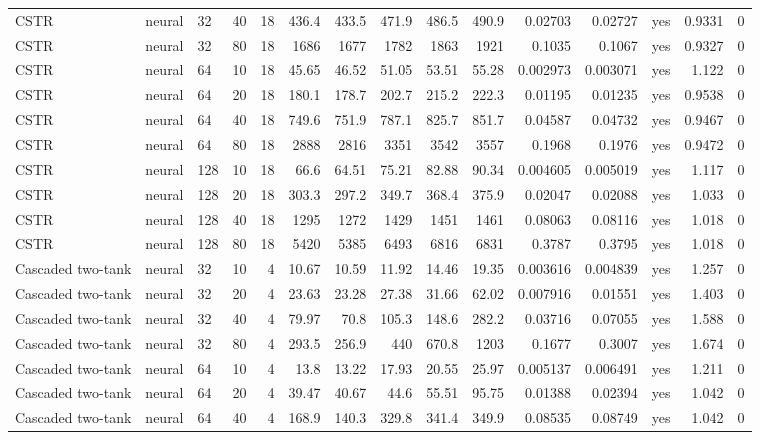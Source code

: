 \begin{table}
\begin{tabular}{lllrrrrrrrrrlrr}
CSTR & neural & 32 & 40 & 18 & 436.4 & 433.5 & 471.9 & 486.5 & 490.9 & 0.02703 & 0.02727 & yes & 0.9331 & 0 \\
CSTR & neural & 32 & 80 & 18 & 1686 & 1677 & 1782 & 1863 & 1921 & 0.1035 & 0.1067 & yes & 0.9327 & 0 \\
CSTR & neural & 64 & 10 & 18 & 45.65 & 46.52 & 51.05 & 53.51 & 55.28 & 0.002973 & 0.003071 & yes & 1.122 & 0 \\
CSTR & neural & 64 & 20 & 18 & 180.1 & 178.7 & 202.7 & 215.2 & 222.3 & 0.01195 & 0.01235 & yes & 0.9538 & 0 \\
CSTR & neural & 64 & 40 & 18 & 749.6 & 751.9 & 787.1 & 825.7 & 851.7 & 0.04587 & 0.04732 & yes & 0.9467 & 0 \\
CSTR & neural & 64 & 80 & 18 & 2888 & 2816 & 3351 & 3542 & 3557 & 0.1968 & 0.1976 & yes & 0.9472 & 0 \\
CSTR & neural & 128 & 10 & 18 & 66.6 & 64.51 & 75.21 & 82.88 & 90.34 & 0.004605 & 0.005019 & yes & 1.117 & 0 \\
CSTR & neural & 128 & 20 & 18 & 303.3 & 297.2 & 349.7 & 368.4 & 375.9 & 0.02047 & 0.02088 & yes & 1.033 & 0 \\
CSTR & neural & 128 & 40 & 18 & 1295 & 1272 & 1429 & 1451 & 1461 & 0.08063 & 0.08116 & yes & 1.018 & 0 \\
CSTR & neural & 128 & 80 & 18 & 5420 & 5385 & 6493 & 6816 & 6831 & 0.3787 & 0.3795 & yes & 1.018 & 0 \\
Cascaded two-tank & neural & 32 & 10 & 4 & 10.67 & 10.59 & 11.92 & 14.46 & 19.35 & 0.003616 & 0.004839 & yes & 1.257 & 0 \\
Cascaded two-tank & neural & 32 & 20 & 4 & 23.63 & 23.28 & 27.38 & 31.66 & 62.02 & 0.007916 & 0.01551 & yes & 1.403 & 0 \\
Cascaded two-tank & neural & 32 & 40 & 4 & 79.97 & 70.8 & 105.3 & 148.6 & 282.2 & 0.03716 & 0.07055 & yes & 1.588 & 0 \\
Cascaded two-tank & neural & 32 & 80 & 4 & 293.5 & 256.9 & 440 & 670.8 & 1203 & 0.1677 & 0.3007 & yes & 1.674 & 0 \\
Cascaded two-tank & neural & 64 & 10 & 4 & 13.8 & 13.22 & 17.93 & 20.55 & 25.97 & 0.005137 & 0.006491 & yes & 1.211 & 0 \\
Cascaded two-tank & neural & 64 & 20 & 4 & 39.47 & 40.67 & 44.6 & 55.51 & 95.75 & 0.01388 & 0.02394 & yes & 1.042 & 0 \\
Cascaded two-tank & neural & 64 & 40 & 4 & 168.9 & 140.3 & 329.8 & 341.4 & 349.9 & 0.08535 & 0.08749 & yes & 1.042 & 0 \\

\end{tabular}
\end{table}
